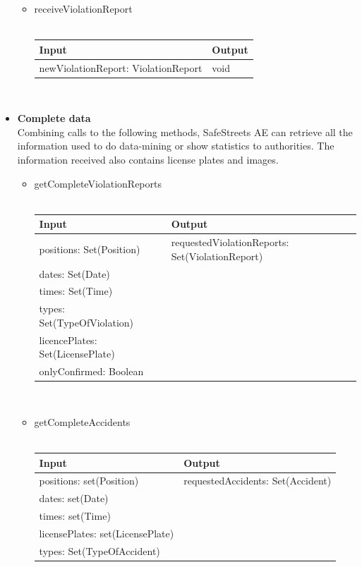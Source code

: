 \documentclass{article}
\begin{document}
\begin{itemize}
				\begin{itemize}
					\item{receiveViolationReport}\\\\
					\begin{tabular}{l | l}
						\textbf{Input} & \textbf{Output}\\
						\hline
						newViolationReport: ViolationReport & void\\
					\end{tabular}\\
				\end{itemize}
			\item \textbf{Complete data}\\
				Combining calls to the following methods, SafeStreets AE can retrieve all the information used to do data-mining or show statistics to authorities. The information received also contains license plates and images.
				\begin{itemize}
					\item{getCompleteViolationReports}\\\\
					\begin{tabular}{l | l}
						\textbf{Input} & \textbf{Output}\\
						\hline
						positions: Set(Position) & requestedViolationReports: Set(ViolationReport) \\
						dates: Set(Date) &\\
						times: Set(Time) &\\
						types: Set(TypeOfViolation) &\\
						licencePlates: Set(LicensePlate)&\\
						onlyConfirmed: Boolean &\\
					\end{tabular}\\
					\item{getCompleteAccidents}\\\\
					\begin{tabular}{l | l}
						\textbf{Input} & \textbf{Output}\\
						\hline
						positions: set(Position) & requestedAccidents: Set(Accident) \\
						dates: set(Date) &\\
						times: set(Time) &\\
						licensePlates: set(LicensePlate)&\\
						types: Set(TypeOfAccident) &\\

\end{tabular}
\end{itemize}
\end{itemize}
\end{document}

